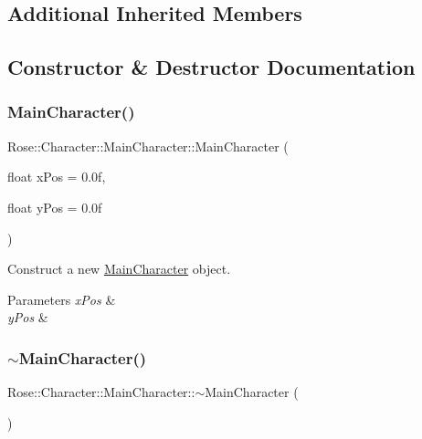 \subsection*{Additional Inherited Members}


\subsection{Constructor \& Destructor Documentation}
\mbox{\label{classRose_1_1Character_1_1MainCharacter_ad5de7cf93078abd4ee5439f29271517e}} 
\subsubsection{\texorpdfstring{MainCharacter()}{MainCharacter()}}
{\footnotesize\ttfamily Rose\+::\+Character\+::\+Main\+Character\+::\+Main\+Character (\begin{DoxyParamCaption}\item[{float}]{x\+Pos = {\ttfamily 0.0f},  }\item[{float}]{y\+Pos = {\ttfamily 0.0f} }\end{DoxyParamCaption})}



Construct a new \mbox{\hyperlink{classRose_1_1Character_1_1MainCharacter}{Main\+Character}} object. 


\begin{DoxyParams}{Parameters}
{\em x\+Pos} & \\
\hline
{\em y\+Pos} & \\
\hline
\end{DoxyParams}
\mbox{\label{classRose_1_1Character_1_1MainCharacter_ac608c6fc2c0b32d1fc93651939ee465e}} 
\subsubsection{\texorpdfstring{$\sim$MainCharacter()}{~MainCharacter()}}
{\footnotesize\ttfamily Rose\+::\+Character\+::\+Main\+Character\+::$\sim$\+Main\+Character (\begin{DoxyParamCaption}{ }\end{DoxyParamCaption})\hspace{0.3cm}{\ttfamily [default]}}



